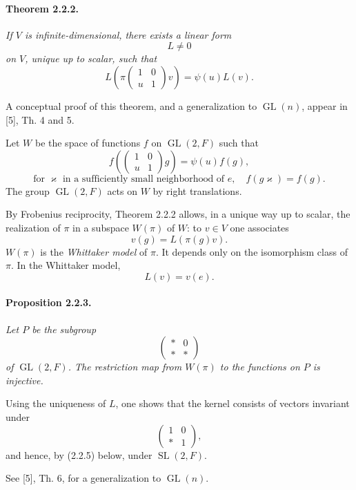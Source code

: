 \documentclass[10pt,a4paper]{article}
\providecommand{\GL}{\operatorname{GL}}
\providecommand{\SL}{\operatorname{SL}}
\begin{document}
\paragraph{Theorem 2.2.2.}{\itshape  If \(V\) is infinite-dimensional, there exists a linear form
\[
L\ne0
\]
on \(V\), unique up to scalar, such that
\[
L\!\left(\pi\!\begin{pmatrix}1&0\\u&1\end{pmatrix}v\right)=\psi(u)L(v).
\]
\par}
A conceptual proof of this theorem, and a generalization to \(\GL(n)\), appear in [5], Th. 4 and 5.

Let \(W\) be the space of functions \(f\) on \(\GL(2,F)\) such that
\[
\tag{a}
f\!\left(\begin{pmatrix}1&0\\u&1\end{pmatrix}g\right)=\psi(u)f(g),
\]
\[
\tag{b}
\text{for }\varkappa\text{ in a sufficiently small neighborhood of }e,\quad f(g\varkappa)=f(g).
\]
The group \(\GL(2,F)\) acts on \(W\) by right translations.

By Frobenius reciprocity, Theorem 2.2.2 allows, in a unique way up to scalar, the realization of \(\pi\) in a subspace \(W(\pi)\) of \(W\): to \(v\in V\) one associates
\[
v(g)=L(\pi(g)v).
\]
\(W(\pi)\) is the \emph{Whittaker model} of \(\pi\). It depends only on the isomorphism class of \(\pi\). In the Whittaker model,
\[
L(v)=v(e).
\]

\paragraph{Proposition 2.2.3.}{\itshape  Let \(P\) be the subgroup
\[
\begin{pmatrix}*&0\\ *&*\end{pmatrix}
\]
of \(\GL(2,F)\). The restriction map from \(W(\pi)\) to the functions on \(P\) is injective.

\par}
Using the uniqueness of \(L\), one shows that the kernel consists of vectors invariant under
\[
\begin{pmatrix}1&0\\ *&1\end{pmatrix},
\]
and hence, by (2.2.5) below, under \(\SL(2,F)\).

See [5], Th. 6, for a generalization to \(\GL(n)\).
\end{document}
